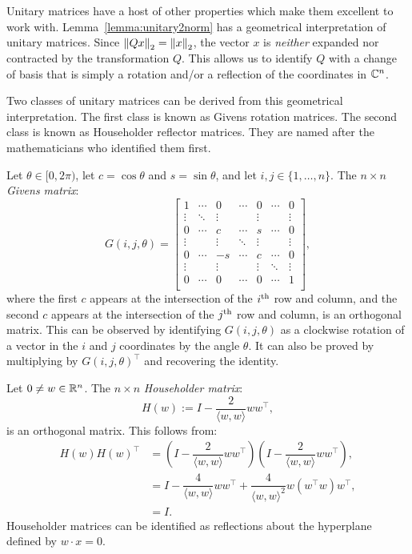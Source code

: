 Unitary matrices have a host of other properties which make them excellent to work with. Lemma~\ref{lemma:unitary2norm} has a geometrical interpretation of unitary matrices. Since $\left\|{Qx}\right\|_2 = \left\|{x}\right\|_2$, the vector $x$ is {\em neither} expanded nor contracted by the transformation $Q$. This allows us to identify $Q$ with a change of basis that is simply a rotation and/or a reflection of the coordinates in $\mathbb{C}^n$.

Two classes of unitary matrices can be derived from this geometrical interpretation. The first class is known as Givens rotation matrices. The second class is known as Householder reflector matrices. They are named after the mathematicians who identified them first.

\begin{example}
Let $\theta\in[0,2\pi)$, let $c = \cos\theta$ and $s=\sin\theta$, and let $i,j\in\{1,\ldots,n\}$. The $n\times n$ {\em Givens matrix}:
\[
G(i,j,\theta) = \begin{bmatrix}
1 & \cdots & 0 & \cdots & 0 & \cdots & 0\\
\vdots & \ddots & \vdots & & \vdots & & \vdots\\
0 & \cdots & c & \cdots & s & \cdots & 0\\
\vdots & & \vdots & \ddots & \vdots & & \vdots\\
0 & \cdots & -s & \cdots & c & \cdots & 0\\
\vdots & & \vdots & & \vdots & \ddots & \vdots\\
0 & \cdots & 0 & \cdots & 0 & \cdots & 1\\
\end{bmatrix},
\]
where the first $c$ appears at the intersection of the $i^{\rm th}$ row and column, and the second $c$ appears at the intersection of the $j^{\rm th}$ row and column, is an orthogonal matrix. This can be observed by identifying $G(i,j,\theta)$ as a clockwise rotation of a vector in the $i$ and $j$ coordinates by the angle $\theta$. It can also be proved by multiplying by $G(i,j,\theta)^\top$ and recovering the identity.
\end{example}

\begin{example}
Let $0\ne w\in\mathbb{R}^n$. The $n\times n$ {\em Householder matrix}:
\[
H(w) := I - \dfrac{2}{\langle w,w\rangle} ww^\top,
\]
is an orthogonal matrix. This follows from:
\begin{align*}
H(w)H(w)^\top & = \left(I - \dfrac{2}{\langle w,w\rangle} ww^\top\right)\left(I - \dfrac{2}{\langle w,w\rangle} ww^\top\right),\\
& = I - \dfrac{4}{\langle w,w\rangle}ww^\top + \dfrac{4}{\langle w,w\rangle^2}w (w^\top w)w^\top,\\
& = I.
\end{align*}
Householder matrices can be identified as reflections about the hyperplane defined by $w\cdot x = 0$.
\end{example}

